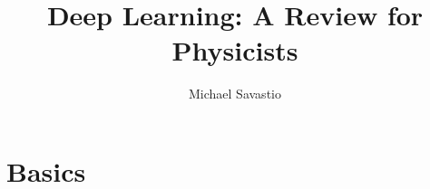 \documentclass{article}
\title{Deep Learning: A Review for Physicists}
\author{Michael Savastio}
\date{}
\begin{document}
\section{Basics}

\end{document}
